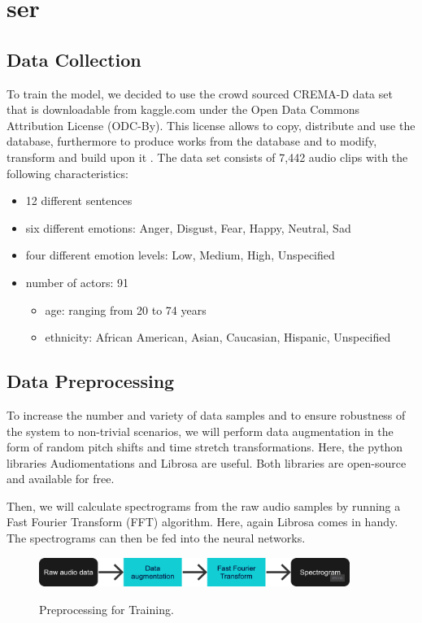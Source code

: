 \section{\acrlong{ser}}
\subsection{Data Collection}
To train the model, we decided to use the crowd sourced CREMA-D data \cite{cremad} set that is downloadable from kaggle.com under the Open Data Commons Attribution License (ODC-By). This license allows to copy, distribute and use the database, furthermore to produce works from the database and to modify, transform and build upon it \cite{odc-by}. The data set consists of 7,442 audio clips with the following characteristics: 
\begin{itemize}
    \item 12 different sentences
    \item six different emotions: Anger, Disgust, Fear, Happy, Neutral, Sad
    \item four different emotion levels: Low, Medium, High, Unspecified
    \item number of actors: 91
    \begin{itemize}
        \item age: ranging from 20 to 74 years
        \item ethnicity: African American, Asian, Caucasian, Hispanic, Unspecified
    \end{itemize}
\end{itemize}



\subsection{Data Preprocessing}
To increase the number and variety of data samples and to ensure robustness of the system to non-trivial scenarios, we will perform data augmentation in the form of random pitch shifts and time stretch transformations. Here, the python libraries Audiomentations and Librosa are useful. Both libraries are open-source and available for free. 

Then, we will calculate spectrograms from the raw audio samples by running a Fast Fourier Transform (FFT) algorithm. Here, again Librosa comes in handy. The spectrograms can then be fed into the neural networks.  \\

\begin{figure}[h]
\centering
\includegraphics[width=0.9\textwidth]{images/ser-preprocessing.png}\\
\caption{Preprocessing for Training.}\label{fig:ser_preprocessing}
\end{figure}